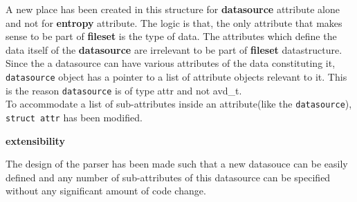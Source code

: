 \noindent A new place has been created in this structure for \textbf{datasource} attribute alone and not for \textbf{entropy} attribute. The logic is that, the only attribute that makes sense to be part of \textbf{fileset} is the type of data. The attributes which define the data itself of the \textbf{datasource} are irrelevant to be part of \textbf{fileset} datastructure.\\
\noindent Since the a datasource can have various attributes of the data constituting it, \verb+datasource+ object has a pointer to a list of attribute objects relevant to it. This is the reason \verb+datasource+ is of type attr and not avd\_t. \\
\noindent To accommodate  a list of sub-attributes inside an attribute(like the \verb+datasource+), \verb+struct attr+ has been modified.




\textbf{extensibility}

The design of the parser has been made such that a new datasouce can be easily defined and any number of sub-attributes of this datasource can be specified without any significant amount of code change.


\noindent 



